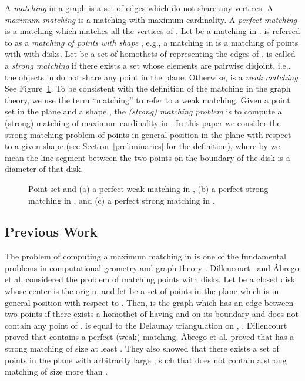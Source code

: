 \documentclass[11pt,a4paper]{article}
\begin{document}
A {\em matching} in a graph  is a set of edges which do not share any vertices. A {\em maximum matching} is a matching with maximum cardinality. A {\em perfect matching} is a matching which matches all the vertices of . Let  be a matching in .  is referred to as a {\em matching of points with shape }, e.g., a matching in  is a matching of points with with disks. Let  be a set of homothets of  representing the edges of .  is called a {\em strong matching} if there exists a set  whose elements are pairwise disjoint, i.e., the objects in  do not share any point in the plane. Otherwise,  is a {\em weak matching}. See Figure~\ref{strong-example}. To be consistent with the definition of the matching in the graph theory, we use the term ``matching'' to refer to a weak matching. Given a point set  in the plane and a shape , the {\em (strong) matching problem} is to compute a (strong) matching of maximum cardinality in .
In this paper we consider the strong matching problem of points in general position in the plane with respect to a given shape  (see Section~\ref{preliminaries} for the definition), where by  we mean the line segment between the two points on the boundary of the disk is a diameter of that disk.

\begin{figure}[htb]
  \centering
\setlength{\tabcolsep}{0in}
  
  \caption{Point set  and (a) a perfect weak matching in , (b) a perfect strong matching in , and (c) a perfect strong matching in .}
\label{strong-example}
\end{figure}

\subsection{Previous Work}
\label{previous-work}
The problem of computing a maximum matching in  is one of the fundamental problems in computational geometry and graph theory \cite{Abrego2004, Abrego2009, Babu2014, Bereg2009, Biniaz2014, Biniaz2015, Dillencourt1990}. 
Dillencourt~\cite{Dillencourt1990} and \'{A}brego et al. \cite{Abrego2004} considered the problem of matching points with disks. Let  be a closed disk  whose center is the origin, and let  be a set of  points in the plane which is in general position with respect to . Then,  is the graph which has an edge between two points  if there exists a homothet of  having  and  on its boundary and does not contain any point of .  is equal to the Delaunay triangulation on , . Dillencourt~\cite{Dillencourt1990} proved that  contains a perfect (weak) matching. \'{A}brego et al. \cite{Abrego2004} proved that  has a strong matching of size at least . They also showed that there exists a set  of  points in the plane with arbitrarily large , such that  does not contain a strong matching of size more than .
\end{document}
